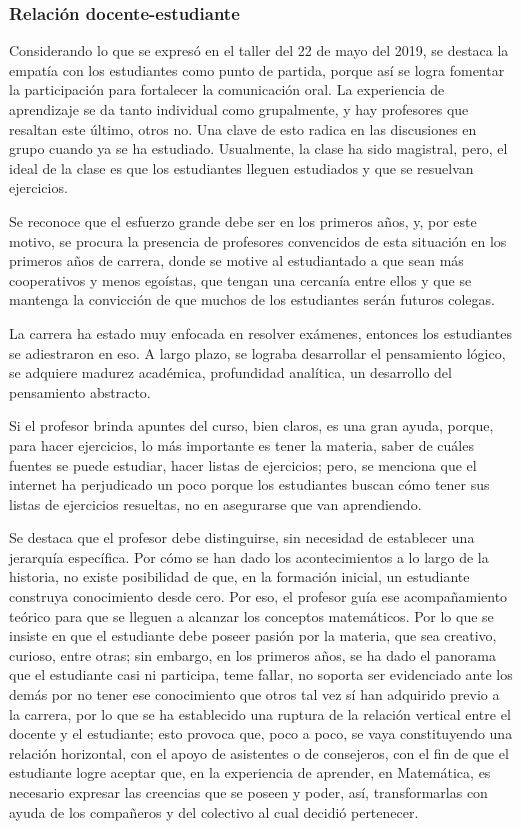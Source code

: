 \subsubsection*{Relación docente-estudiante}

Considerando lo que se expresó en el taller del 22 de mayo del 2019, se destaca la empatía con los estudiantes como punto de partida, porque así se logra fomentar la participación para fortalecer la comunicación oral. La experiencia de aprendizaje se da tanto individual como grupalmente, y hay profesores que resaltan este último, otros no. Una clave de esto radica en las discusiones en grupo cuando ya se ha estudiado. Usualmente, la clase ha sido magistral, pero, el ideal de la clase es que los estudiantes lleguen estudiados y que se resuelvan ejercicios. 

Se reconoce que el esfuerzo grande debe ser en los primeros años, y, por este motivo, se procura la presencia de profesores convencidos de esta situación en los primeros años de carrera, donde se motive al estudiantado a que sean más cooperativos y menos egoístas, que tengan una cercanía entre ellos y que se mantenga la convicción de que muchos de los estudiantes serán futuros colegas. 

La carrera ha estado muy enfocada en resolver exámenes, entonces los estudiantes se adiestraron en eso. A largo plazo, se lograba desarrollar el pensamiento lógico, se adquiere madurez académica, profundidad analítica, un desarrollo del pensamiento abstracto. 

Si el profesor brinda apuntes del curso, bien claros, es una gran ayuda, porque, para hacer ejercicios, lo más importante es tener la materia, saber de cuáles fuentes se puede estudiar, hacer listas de ejercicios; pero, se menciona que el internet ha perjudicado un poco porque los estudiantes buscan cómo tener sus listas de ejercicios resueltas, no en asegurarse que van aprendiendo. 

Se destaca que el profesor debe distinguirse, sin necesidad de establecer una jerarquía específica. Por cómo se han dado los acontecimientos a lo largo de la historia, no existe posibilidad de que, en la formación inicial, un estudiante construya conocimiento desde cero. Por eso, el profesor guía ese acompañamiento teórico para que se lleguen a alcanzar los conceptos matemáticos. Por lo que se insiste en que el estudiante debe poseer pasión por la materia, que sea creativo, curioso, entre otras; sin embargo, en los primeros años, se ha dado el panorama que el estudiante casi ni participa, teme fallar, no soporta ser evidenciado ante los demás por no tener ese conocimiento que otros tal vez sí han adquirido previo a la carrera, por lo que se ha establecido una ruptura de la relación vertical entre el docente y el estudiante; esto provoca que, poco a poco, se vaya constituyendo una relación horizontal, con el apoyo de asistentes o de consejeros, con el fin de que el estudiante logre aceptar que, en la experiencia de aprender, en Matemática, es necesario expresar las creencias que se poseen y poder, así, transformarlas con ayuda de los compañeros y del colectivo al cual decidió pertenecer. 

